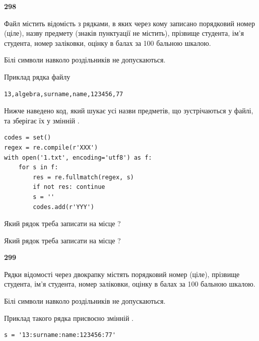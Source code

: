 \newpage

{\begin {center}\textbf{ 298}\end {center}}\par
Файл  містить відомість з рядками, в яких через кому записано поряд\-ковий номер (ціле), назву предмету (знаків пунктуації не містить), прізвище студента, ім'я студента, номер заліковки, оцінку в балах за 100 бальною шкалою.

Білі символи навколо роздільників не допускаються.

Приклад рядка файлу



\begin{verbatim}
13,algebra,surname,name,123456,77
\end{verbatim}


Нижче наведено код, який шукає усі назви предметів, що зустрічаються у файлі, та зберігає їх у змінній .



\begin{verbatim}
codes = set()
regex = re.compile(r'XXX')
with open('1.txt', encoding='utf8') as f:
    for s in f:
        res = re.fullmatch(regex, s)
        if not res: continue
        s = ''
        codes.add(r'YYY')
\end{verbatim}





Який рядок треба записати на місце  ?\par
\vspace{5mm}


Який рядок треба записати на місце  ?\par


\newpage

{\begin {center}\textbf{ 299}\end {center}}\par
Рядки відомості через двокрапку містять порядковий номер (ціле), пріз\-ви\-ще студен\-та, ім'я студента, номер заліковки, оцінку в балах за 100 бальною шкалою.

Білі символи навколо роздільників не допускаються.

Приклад такого рядка присвоєно змінній .



\begin{verbatim}
s = '13:surname:name:123456:77'
\end{verbatim}


